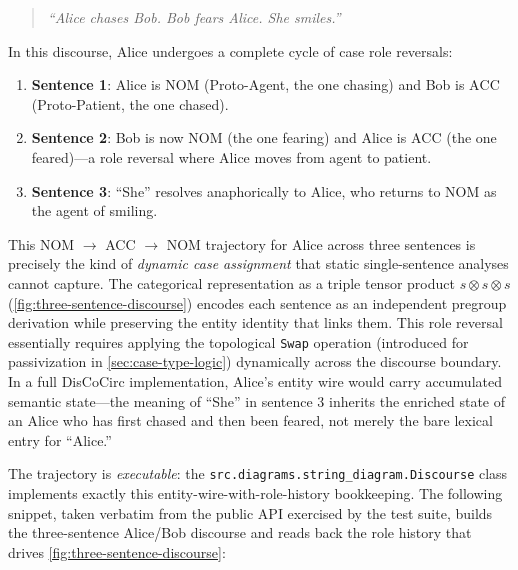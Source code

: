 \documentclass[
]{article}
\providecommand{\tightlist}{%
  \setlength{\itemsep}{0pt}\setlength{\parskip}{0pt}}
\begin{document}
\begin{quote}
\emph{``Alice chases Bob. Bob fears Alice. She smiles.''}
\end{quote}

In this discourse, Alice undergoes a complete cycle of case role
reversals:

\begin{enumerate}
\def\labelenumi{\arabic{enumi}.}
\tightlist
\item
  \textbf{Sentence 1}: Alice is \(\text{NOM}\) (Proto-Agent, the one
  chasing) and Bob is \(\text{ACC}\) (Proto-Patient, the one chased).
\item
  \textbf{Sentence 2}: Bob is now \(\text{NOM}\) (the one fearing) and
  Alice is \(\text{ACC}\) (the one feared)---a role reversal where Alice
  moves from agent to patient.
\item
  \textbf{Sentence 3}: ``She'' resolves anaphorically to Alice, who
  returns to \(\text{NOM}\) as the agent of smiling.
\end{enumerate}

This NOM \(\to\) ACC \(\to\) NOM trajectory for Alice across three
sentences is precisely the kind of \emph{dynamic case assignment} that
static single-sentence analyses cannot capture. The categorical
representation as a triple tensor product \(s \otimes s \otimes s\)
(\autoref{fig:three-sentence-discourse}) encodes each sentence as an
independent pregroup derivation while preserving the entity identity
that links them. This role reversal essentially requires applying the
topological \texttt{Swap} operation (introduced for passivization in
\autoref{sec:case-type-logic}) dynamically across the discourse
boundary. In a full DisCoCirc implementation, Alice's entity wire would
carry accumulated semantic state---the meaning of ``She'' in sentence 3
inherits the enriched state of an Alice who has first chased and then
been feared, not merely the bare lexical entry for ``Alice.''

The trajectory is \emph{executable}: the
\texttt{src.diagrams.string\_diagram.Discourse} class implements exactly
this entity-wire-with-role-history bookkeeping. The following snippet,
taken verbatim from the public API exercised by the test suite, builds
the three-sentence Alice/Bob discourse and reads back the role history
that drives \autoref{fig:three-sentence-discourse}:
\end{document}
